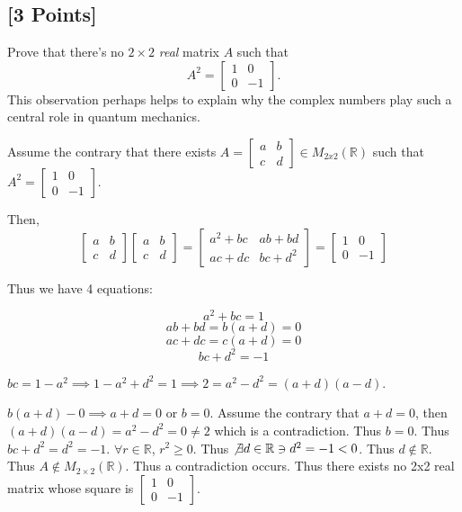 \documentclass[11pt]{article}
\begin{document}
\begin{solution}
\end{solution}


\subsection{[3 Points]} Prove that there's no $2 \times 2$ \emph{real} matrix $A$ such
that
\[
A^2=
\begin{bmatrix}
	1 & 0\\
	0 & -1
\end{bmatrix}\!.
\]
This observation perhaps helps to explain why the complex numbers play such a
central role in quantum mechanics.

\begin{solution}
	Assume the contrary that there exists $A = \begin{bmatrix}
		a & b \\ c & d
	\end{bmatrix} \in M_{2 x 2}(\mathbb{R})$ such that $A^2 = \begin{bmatrix}
		1 & 0 \\ 0 & -1
	\end{bmatrix}$. 

	Then, \[
		\begin{bmatrix}
			a & b \\ c & d
		\end{bmatrix}  \begin{bmatrix}
			a & b \\ c & d
		\end{bmatrix} = \begin{bmatrix}
			a^2 + bc & ab + bd \\ ac + dc & bc + d^2 
		\end{bmatrix} = \begin{bmatrix}
			1 & 0\\
			0 & -1
		\end{bmatrix}
	\]

	Thus we have 4 equations: 

	\[a^2 + bc = 1\]
	\[ab + bd = b(a + d) = 0\]
	\[ac + dc = c(a + d) = 0\]
	\[bc + d^2 = -1\]

	$bc = 1 - a^2 \implies 1 - a^2 + d^2 = 1 \implies 2 = a^2 - d^2 = (a + d)(a - d)$. 
	
	$b(a + d) - 0 \implies a + d = 0$ or $b = 0$. Assume the contrary that $a + d = 0$, then $(a + d)(a - d) = a^2 - d^2 = 0 \neq 2$ which is a contradiction. Thus $b = 0$. Thus $bc + d^2 = d^2 = -1$. $\forall r \in \mathbb{R}$, $r^2 \geq 0$. Thus $\not \exists d \in \mathbb{R} \ni d^2 = -1 < 0$. Thus $d \not \in \mathbb{R}$. Thus $A \not \in M_{2 \times 2}(\mathbb{R})$. Thus a contradiction occurs. Thus there exists no 2x2 real matrix whose square is $ \begin{bmatrix}
		1 & 0 \\ 0 & -1
	\end{bmatrix}$.                 
\end{solution}
\end{document}
